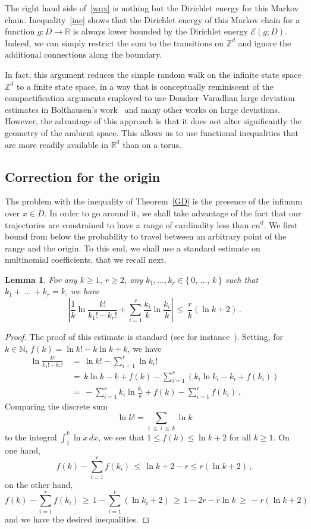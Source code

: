 \documentclass[10pt]{amsart}
\newtheorem{lemm}[theo]{Lemma}\newtheorem{prop}[theo]{Proposition}\newtheorem{coro}[theo]{Corollary}\newtheorem{conj}[theo]{Conjecture}
\theoremstyle{definition}\newtheorem{defi}[theo]{Definition}\newtheorem{rema}[theo]{Remark}\newtheorem{exam}[theo]{Example}\newtheorem{exem}[theo]{Example}\newtheorem{nota}[theo]{Notation}
\newcommand*\bD{\overline{D}}
\newcommand*\R{\mathbb{R}}
\begin{document}
The right hand side of~\eqref{wqx} is nothing but the Dirichlet energy for this Markov chain. Inequality~\eqref{ine} shows that the Dirichlet energy of this Markov chain for a function $g: D \to \R$ is always lower bounded by the Dirichlet energy $\mathcal{E}(g; D)$. Indeed, we can simply restrict the sum to the transitions on $\mathbb{Z}^d$ and ignore the additional connections along the boundary.

In fact, this argument reduces the simple random walk on the infinite state space $\mathbb{Z}^d$ to a finite state space, in a way that is conceptually reminiscent of the compactification arguments employed to use Donsker--Varadhan large deviation estimates in Bolthausen's work~\cite{BO} and many other works on large deviations. However, the advantage of this approach is that it does not alter significantly the geometry of the ambient space. This allows us to use functional inequalities that are more readily available in $\R^d$ than on a torus.

\subsection{Correction for the origin}\label{corr}
The problem with the inequality of Theorem~\ref{GD} is the presence of the infimum over $x\in\bD$. In order to go around it, we shall take advantage of the fact that our trajectories are constrained to have a range of cardinality less than $cn^d$. We first bound from below the probability to travel between an arbitrary point of the range and the origin. To this end, we shall use a standard estimate on multinomial coefficients, that we recall next.
\begin{lemm}\label{lf}
For any $k\geq 1$, $r\geq 2$, any $k_1,\dots,k_r\in\{\,0,\,\dots,\,k\,\}$ such that $k_1+\,\dots\,+k_r=k$, we have
\[
\left|\frac{1}{k}\ln
\frac{k!}{ k_1!\,\cdots\,k_r!} +\sum_{i=1}^r
\frac{k_i}{ k}\ln \frac{k_i}{ k}
\right|
\,\leq\,
\frac{r}{ k}(\ln k+2)
\,.
\]
\end{lemm}
%

\begin{proof}
The proof of this estimate is standard (see for instance~\cite{EL}). Setting, for $k\in\mathbb N$, $f(k)=\ln k!-k\ln k+k$, we have
\begin{align*}
\ln\frac{k!}{ k_1!\,\cdots\,k_r!}
\,&=\,\ln k!-\sum_{i=1}^r\ln k_i!\\
\,&=\,k\ln k-k+f(k)-\sum_{i=1}^r(k_i\ln k_i-k_i+f(k_i))\\
\,&=\,-\sum_{i=1}^r {k_i}\ln \frac{k_i}{k} +f(k)-\sum_{i=1}^rf(k_i)\,.
\end{align*}
Comparing the discrete sum
\[
\ln k!=\sum_{1\,\leq\,i\,\leq\,k}\ln k
\]
to the integral $\int_1^k\ln x\,dx$, we see that $1\leq f(k)\leq \ln k +2$ for all $k\geq 1$. On one hand,
\[
f(k)-\sum_{i=1}^rf(k_i)\,\leq\, \ln k+2-r\leq r(\ln k+2)\,,
\]
on the other hand,
\[
f(k)-\sum_{i=1}^rf(k_i)\,\geq\, 1-
\sum_{i=1}^r(\ln k_i+2)\,\geq\,
1-2r-r\ln k\,\geq\, -r(\ln k+2)\,
\]
and we have the desired inequalities.
\end{proof}
\end{document}
